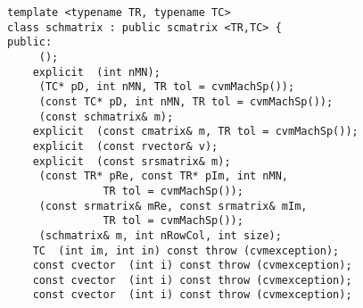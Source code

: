 \bigskip
\noindent
\verb"template <typename TR, typename TC>"\\
\verb"class schmatrix : public scmatrix <TR,TC> {"\\
\verb"public:"\\
\verb"    "\verb" ();"\\
\verb"    explicit "\verb" (int nMN);"\\
\verb"    "\verb" (TC* pD, int nMN, TR tol = cvmMachSp());"\\
\verb"    "\verb" (const TC* pD, int nMN, TR tol = cvmMachSp());"\\
\verb"    "\verb" (const schmatrix& m);"\\
\verb"    explicit "\verb" (const cmatrix& m, TR tol = cvmMachSp());"\\
\verb"    explicit "\verb" (const rvector& v);"\\
\verb"    explicit "\verb" (const srsmatrix& m);"\\
\verb"    "\verb" (const TR* pRe, const TR* pIm, int nMN,"\\
\verb"               TR tol = cvmMachSp());"\\
\verb"    "\verb" (const srmatrix& mRe, const srmatrix& mIm,"\\
\verb"               TR tol = cvmMachSp());"\\
\verb"    "\verb" (schmatrix& m, int nRowCol, int size);"\\
\verb"    TC "\verb" (int im, int in) const throw (cvmexception);"\\
\verb"    const cvector "\verb" (int i) const throw (cvmexception);"\\
\verb"    const cvector "\verb" (int i) const throw (cvmexception);"\\
\verb"    const cvector "\verb" (int i) const throw (cvmexception);"\\
